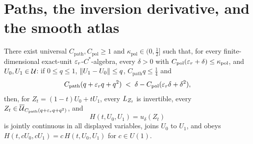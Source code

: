 \section{Paths, the inversion derivative, and the smooth atlas}\label{sec:stage1-smooth-polar}

\begin{lemma}\label{lem:stage1-polar-path-admissibility}
There exist universal $C_{\mathrm{path}},C_{\mathrm{pol}}\ge1$ and
$\kappa_{\mathrm{pol}}\in(0,\tfrac12]$ such that, for every finite-dimensional exact-unit
$\varepsilon_r$-$C^*$-algebra, every $\delta>0$ with
$C_{\mathrm{pol}}(\varepsilon_r+\delta)\le\kappa_{\mathrm{pol}}$, and $U_0,U_1\in\mathcal U$: if
$0\le q\le1$, $\lVert U_1-U_0\rVert\le q$, $C_{\mathrm{path}}q\le\tfrac14$ and
\begin{equation}\label{eq:s1pa-guard}
  C_{\mathrm{path}}(q+\varepsilon_rq+q^{2})\;<\;\delta-C_{\mathrm{pol}}(\varepsilon_r\delta+\delta^{2}),
\end{equation}
then, for $Z_t=(1-t)U_0+tU_1$, every $L_{Z_t}$ is invertible, every
$Z_t\in\overline{\mathcal U}_{C_{\mathrm{path}}(q+\varepsilon_rq+q^{2})}$, and
\begin{equation}\label{eq:s1pa-H}
  H(t,U_0,U_1)=u_\delta(Z_t)
\end{equation}
is jointly continuous in all displayed variables, joins $U_0$ to $U_1$, and obeys
$H(t,cU_0,cU_1)=c\,H(t,U_0,U_1)$ for $c\in U(1)$.
\end{lemma}

